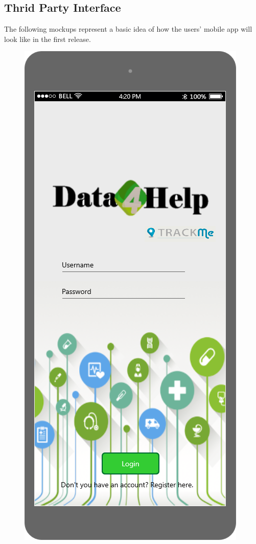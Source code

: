 \subsection{Thrid Party Interface}

The following mockups represent a basic idea of how the users' mobile app will look like in the first 
release. 

\begin{figure}[h!]
	\centering
 	 \begin{minipage}[b]{0.25\textwidth}
    		\includegraphics[width=\textwidth]{./pictures/login_3p.png}

\end{minipage}
\end{figure}
